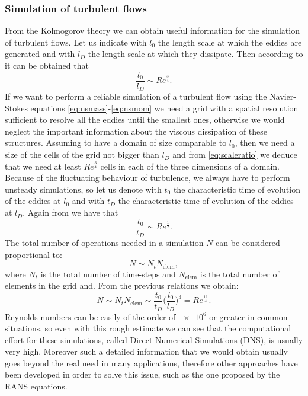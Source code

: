 \subsubsection{Simulation of turbulent flows}
From the Kolmogorov theory we can obtain useful information for the simulation 
of turbulent flows. Let us indicate with $l_0$ the length scale at which the 
eddies are generated and with $l_D$ the length scale at which they dissipate. 
Then according to \cite{turbo:kolmogorov} it can be obtained that
\begin{equation} \label{eq:scaleratio}
	\frac{l_0}{l_D} \sim Re^\frac{3}{4}.
\end{equation}
If we want to perform a reliable simulation of a turbulent flow using the 
Navier-Stokes equations \eqref{eq:nsmass}-\eqref{eq:nsmom} we need a grid with 
a spatial resolution sufficient to resolve all the eddies until the smallest 
ones, otherwise we would neglect the important information about the viscous 
dissipation of these structures. Assuming to have a domain of size comparable 
to $l_0$, then we need a size of the cells of the grid not bigger than $l_D$ and
from \eqref{eq:scaleratio} we deduce that we need at least $Re^\frac{3}{4}$ 
cells in each of the three dimensions of a domain. Because of the fluctuating 
behaviour of turbulence, we always have to perform unsteady simulations, so let 
us denote with $t_0$ the characteristic time of evolution of the eddies at 
$l_0$ and with $t_D$ the characteristic time of evolution of the eddies at 
$l_D$. Again from \cite{turbo:kolmogorov} we have that
\begin{equation}
\frac{t_0}{t_D} \sim Re^\frac{1}{2}.
\end{equation}
The total number of operations needed in a simulation $N$ can be considered 
proportional to:
\begin{equation}
	N \sim  N_t N_\text{elem},
\end{equation}
where $N_t$ is the total number of time-steps and $N_\text{elem}$ is the total 
number 
of elements in the grid and. From the previous relations we obtain:
\begin{equation}
	N \sim N_t N_\text{elem} \sim \frac{t_0}{t_D} \bigg(\frac{l_0}{l_D}\bigg)^3 
	= Re^\frac{11}{4}.
\end{equation}
Reynolds numbers can be easily of the order of $\num{e6}$ or greater in common 
situations, so even with this rough estimate we can see that the computational 
effort for these simulations, called Direct Numerical Simulations (DNS), is 
usually very high. Moreover such a detailed information that we would obtain 
usually goes beyond the real need in many applications, therefore other 
approaches have been developed in order to solve this issue, such as the one 
proposed by the RANS equations.
%
